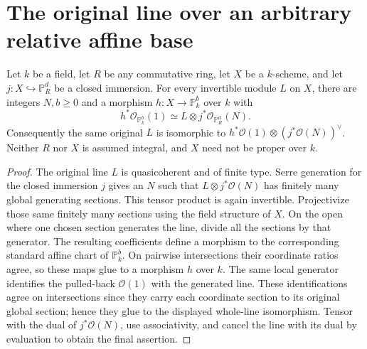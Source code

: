 \section{The original line over an arbitrary relative affine base}

\begin{lemma}
\label{lem:kn-relative-arithmetic-original-line-expression}
\leanok
Let $k$ be a field, let $R$ be any commutative ring, let $X$ be a
$k$-scheme, and let $j:X\hookrightarrow\mathbb P_R^d$ be a closed
immersion.  For every invertible module $L$ on $X$, there are integers
$N,b\geq0$ and a morphism $h:X\to\mathbb P_k^b$ over $k$ with
\[
 h^*\mathcal O_{\mathbb P_k^b}(1)
   \simeq L\otimes j^*\mathcal O_{\mathbb P_R^d}(N).
\]
Consequently the same original $L$ is isomorphic to
$h^*\mathcal O(1)\otimes(j^*\mathcal O(N))^\vee$.
Neither $R$ nor $X$ is assumed integral, and $X$ need not be proper
over $k$.
\end{lemma}
\begin{proof}
The original line $L$ is quasicoherent and of finite type.  Serre
generation for the closed immersion $j$ gives an $N$ such that
$L\otimes j^*\mathcal O(N)$ has finitely many global generating
sections.  This tensor product is again invertible.  Projectivize
those same finitely many sections using the field structure of $X$.
On the open where one chosen section generates the line, divide all
the sections by that generator.  The resulting coefficients define
a morphism to the corresponding standard affine chart of
$\mathbb P_k^b$.  On pairwise intersections their coordinate ratios
agree, so these maps glue to a morphism $h$ over $k$.  The same local
generator identifies the pulled-back $\mathcal O(1)$ with the
generated line.  These identifications agree on intersections since
they carry each coordinate section to its original global section;
hence they glue to the displayed whole-line isomorphism.  Tensor
with the dual of $j^*\mathcal O(N)$, use associativity, and cancel the
line with its dual by evaluation to obtain the final assertion.
\end{proof}
